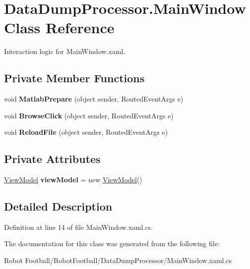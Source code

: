 \hypertarget{class_data_dump_processor_1_1_main_window}{\section{Data\-Dump\-Processor.\-Main\-Window Class Reference}
\label{class_data_dump_processor_1_1_main_window}
}


Interaction logic for Main\-Window.\-xaml.  


\subsection*{Private Member Functions}
\begin{DoxyCompactItemize}
\item 
\hypertarget{class_data_dump_processor_1_1_main_window_ac65e8cc92dc3708067198774f7adaa7e}{void {\bfseries Matlab\-Prepare} (object sender, Routed\-Event\-Args e)}\label{class_data_dump_processor_1_1_main_window_ac65e8cc92dc3708067198774f7adaa7e}

\item 
\hypertarget{class_data_dump_processor_1_1_main_window_ab6cfb1a2d267bb2216f07bc6ea511051}{void {\bfseries Browse\-Click} (object sender, Routed\-Event\-Args e)}\label{class_data_dump_processor_1_1_main_window_ab6cfb1a2d267bb2216f07bc6ea511051}

\item 
\hypertarget{class_data_dump_processor_1_1_main_window_a1c7a8818e0d0b90b6f24f74d79ce7d0c}{void {\bfseries Reload\-File} (object sender, Routed\-Event\-Args e)}\label{class_data_dump_processor_1_1_main_window_a1c7a8818e0d0b90b6f24f74d79ce7d0c}

\end{DoxyCompactItemize}
\subsection*{Private Attributes}
\begin{DoxyCompactItemize}
\item 
\hypertarget{class_data_dump_processor_1_1_main_window_ad6a4b8c300d0923df204443c9a42226b}{\hyperlink{class_data_dump_processor_1_1_view_model}{View\-Model} {\bfseries view\-Model} = new \hyperlink{class_data_dump_processor_1_1_view_model}{View\-Model}()}\label{class_data_dump_processor_1_1_main_window_ad6a4b8c300d0923df204443c9a42226b}

\end{DoxyCompactItemize}


\subsection{Detailed Description}


Definition at line 14 of file Main\-Window.\-xaml.\-cs.



The documentation for this class was generated from the following file\-:\begin{DoxyCompactItemize}
\item 
Robot Football/\-Robot\-Football/\-Data\-Dump\-Processor/Main\-Window.\-xaml.\-cs\end{DoxyCompactItemize}
